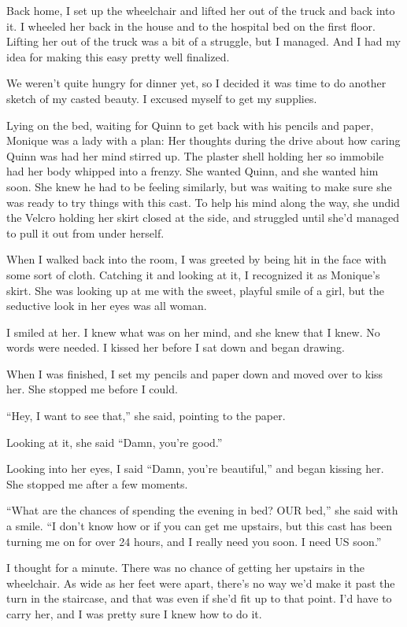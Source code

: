 Back home, I set up the wheelchair and lifted her out of the truck and back into it. I
wheeled her back in the house and to the hospital bed on the first floor. Lifting her out of the
truck was a bit of a struggle, but I managed. And I had my idea for making this easy pretty well
finalized.

We weren't quite hungry for dinner yet, so I decided it was time to do another sketch of my
casted beauty. I excused myself to get my supplies.

\begin{thought}
Lying on the bed, waiting for Quinn to get back with his pencils and paper, Monique was a
lady with a plan: Her thoughts during the drive about how caring Quinn was had her mind stirred
up. The plaster shell holding her so immobile had her body whipped into a frenzy. She wanted
Quinn, and she wanted him soon. She knew he had to be feeling similarly, but was waiting to make
sure she was ready to try things with this cast. To help his mind along the way, she undid the
Velcro holding her skirt closed at the side, and struggled until she'd managed to pull it out
from under herself.
\end{thought}

When I walked back into the room, I was greeted by being hit in the face with some sort of
cloth. Catching it and looking at it, I recognized it as Monique's skirt. She was looking up at
me with the sweet, playful smile of a girl, but the seductive look in her eyes was all woman.

I smiled at her. I knew what was on her mind, and she knew that I knew. No words were
needed. I kissed her before I sat down and began drawing.

When I was finished, I set my pencils and paper down and moved over to kiss her. She
stopped me before I could.

``Hey, I want to see that,'' she said, pointing to the paper.

Looking at it, she said ``Damn, you're good.''

Looking into her eyes, I said ``Damn, you're beautiful,'' and began kissing her. She stopped
me after a few moments.

``What are the chances of spending the evening in bed? OUR bed,'' she said with a smile. ``I
don't know how or if you can get me upstairs, but this cast has been turning me on for over 24
hours, and I really need you soon. I need US soon.''

I thought for a minute. There was no chance of getting her upstairs in the wheelchair. As
wide as her feet were apart, there's no way we'd make it past the turn in the staircase, and
that was even if she'd fit up to that point. I'd have to carry her, and I was pretty sure I knew
how to do it.


